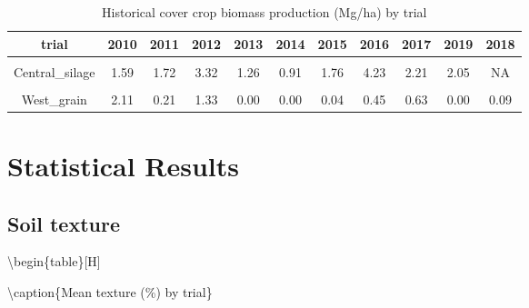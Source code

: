 \documentclass[
]{article}
\begin{document}
\begin{table}[H]

\caption{\label{tab:ccbio}Historical cover crop biomass production (Mg/ha) by trial}
\centering
\begin{tabular}[t]{ccccccccccc}
\toprule
trial & 2010 & 2011 & 2012 & 2013 & 2014 & 2015 & 2016 & 2017 & 2019 & 2018\\
\midrule
\cellcolor{gray!6}{Central\_grain} & \cellcolor{gray!6}{0.86} & \cellcolor{gray!6}{0.28} & \cellcolor{gray!6}{1.37} & \cellcolor{gray!6}{0.25} & \cellcolor{gray!6}{0.47} & \cellcolor{gray!6}{0.61} & \cellcolor{gray!6}{2.22} & \cellcolor{gray!6}{2.76} & \cellcolor{gray!6}{1.29} & \cellcolor{gray!6}{NA}\\
\cmidrule{1-11}
Central\_silage & 1.59 & 1.72 & 3.32 & 1.26 & 0.91 & 1.76 & 4.23 & 2.21 & 2.05 & NA\\
\cmidrule{1-11}
\cellcolor{gray!6}{East\_grain} & \cellcolor{gray!6}{2.11} & \cellcolor{gray!6}{1.46} & \cellcolor{gray!6}{0.00} & \cellcolor{gray!6}{0.92} & \cellcolor{gray!6}{0.00} & \cellcolor{gray!6}{0.36} & \cellcolor{gray!6}{0.51} & \cellcolor{gray!6}{7.30} & \cellcolor{gray!6}{0.30} & \cellcolor{gray!6}{0.19}\\
\cmidrule{1-11}
West\_grain & 2.11 & 0.21 & 1.33 & 0.00 & 0.00 & 0.04 & 0.45 & 0.63 & 0.00 & 0.09\\
\bottomrule
\end{tabular}
\end{table}

\newpage

\hypertarget{statistical-results}{%
\section{Statistical Results}\label{statistical-results}}

\hypertarget{soil-texture}{%
\subsection{Soil texture}\label{soil-texture}}

\textbackslash begin\{table\}{[}H{]}

\textbackslash caption\{\label{tab:texture}Mean texture (\%) by trial\}
\centering
\end{document}
